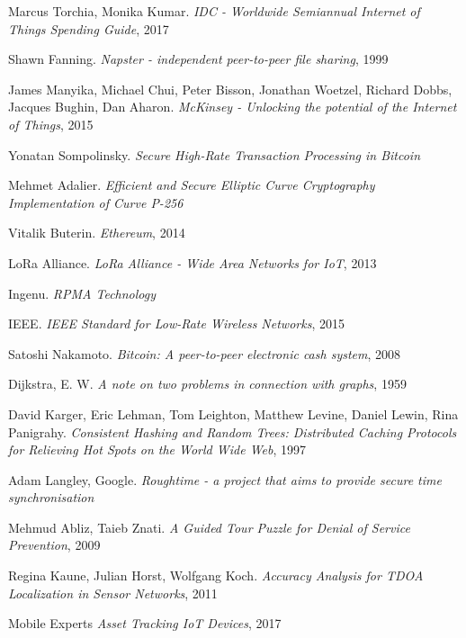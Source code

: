 \documentclass[UTF8, 10pt, nonatbib, nocopyrightspace, reprint]{sigplanconf}
\begin{document}
\begin{thebibliography}{10}
\softraggedright

    Marcus Torchia, Monika Kumar. 
    \emph{IDC - Worldwide Semiannual Internet of Things Spending Guide}, 2017

    Shawn Fanning.
    \emph{Napster - independent peer-to-peer file sharing}, 1999

    James Manyika, Michael Chui, Peter Bisson, Jonathan Woetzel, Richard Dobbs, Jacques Bughin, Dan Aharon.
    \emph{McKinsey - Unlocking the potential of the Internet of Things}, 2015

    Yonatan Sompolinsky.
    \emph{Secure High-Rate Transaction Processing in Bitcoin}

    Mehmet Adalier.
    \emph{Efficient and Secure Elliptic Curve Cryptography Implementation of Curve P-256}

    Vitalik Buterin.
    \emph{Ethereum}, 2014

    LoRa Alliance.
    \emph{LoRa Alliance - Wide Area Networks for IoT}, 2013

    Ingenu.
    \emph{RPMA Technology}

    IEEE.
    \emph{IEEE Standard for Low-Rate Wireless Networks}, 2015

    Satoshi Nakamoto.
    \emph{Bitcoin: A peer-to-peer electronic cash system}, 2008

    Dijkstra, E. W.
    \emph{A note on two problems in connection with graphs}, 1959

    David Karger, Eric Lehman, Tom Leighton, Matthew Levine, Daniel Lewin, Rina Panigrahy.
    \emph{Consistent Hashing and Random Trees: Distributed Caching Protocols for Relieving Hot Spots on the World Wide Web}, 1997

    Adam Langley, Google.
    \emph{Roughtime - a project that aims to provide secure time synchronisation}

    Mehmud Abliz, Taieb Znati.
    \emph{A Guided Tour Puzzle for Denial of Service Prevention}, 2009

    Regina Kaune, Julian Horst, Wolfgang Koch.
    \emph{Accuracy Analysis for TDOA Localization in Sensor Networks}, 2011

    Mobile Experts
    \emph{Asset Tracking IoT Devices}, 2017


\end{thebibliography}
\end{document}

